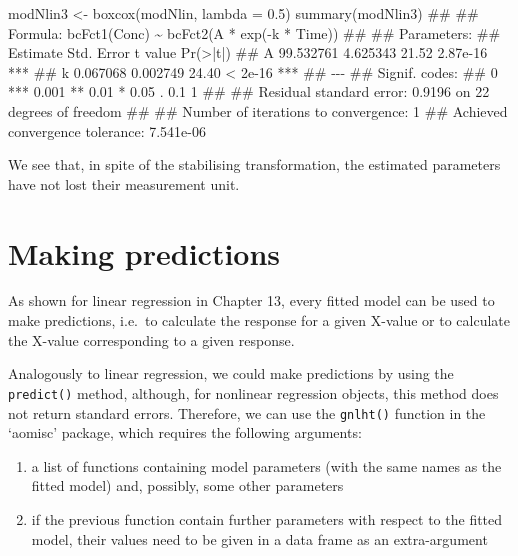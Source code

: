 \documentclass[a4paper,12pt,oneside]{book}
\providecommand{\tightlist}{%
  \setlength{\itemsep}{0pt}\setlength{\parskip}{0pt}}
\newenvironment{Shaded}{\begin{snugshade}}{\end{snugshade}}
\newcommand{\FloatTok}[1]{#1}
\newcommand{\DocumentationTok}[1]{#1}
\newcommand{\OtherTok}[1]{#1}
\newcommand{\FunctionTok}[1]{#1}
\newcommand{\AttributeTok}[1]{#1}
\newcommand{\NormalTok}[1]{#1}
\begin{document}
\vspace{12pt}

\begin{Shaded}
\begin{Highlighting}[]
\NormalTok{modNlin3 }\OtherTok{\textless{}{-}} \FunctionTok{boxcox}\NormalTok{(modNlin, }\AttributeTok{lambda =} \FloatTok{0.5}\NormalTok{)}
\FunctionTok{summary}\NormalTok{(modNlin3)}
\DocumentationTok{\#\# }
\DocumentationTok{\#\# Formula: bcFct1(Conc) \textasciitilde{} bcFct2(A * exp({-}k * Time))}
\DocumentationTok{\#\# }
\DocumentationTok{\#\# Parameters:}
\DocumentationTok{\#\#    Estimate Std. Error t value Pr(\textgreater{}|t|)    }
\DocumentationTok{\#\# A 99.532761   4.625343   21.52 2.87e{-}16 ***}
\DocumentationTok{\#\# k  0.067068   0.002749   24.40  \textless{} 2e{-}16 ***}
\DocumentationTok{\#\# {-}{-}{-}}
\DocumentationTok{\#\# Signif. codes:  }
\DocumentationTok{\#\# 0 \textquotesingle{}***\textquotesingle{} 0.001 \textquotesingle{}**\textquotesingle{} 0.01 \textquotesingle{}*\textquotesingle{} 0.05 \textquotesingle{}.\textquotesingle{} 0.1 \textquotesingle{} \textquotesingle{} 1}
\DocumentationTok{\#\# }
\DocumentationTok{\#\# Residual standard error: 0.9196 on 22 degrees of freedom}
\DocumentationTok{\#\# }
\DocumentationTok{\#\# Number of iterations to convergence: 1 }
\DocumentationTok{\#\# Achieved convergence tolerance: 7.541e{-}06}
\end{Highlighting}
\end{Shaded}

We see that, in spite of the stabilising transformation, the estimated parameters have not lost their measurement unit.

\hypertarget{making-predictions-1}{%
\section{Making predictions}\label{making-predictions-1}}

As shown for linear regression in Chapter 13, every fitted model can be used to make predictions, i.e.~to calculate the response for a given X-value or to calculate the X-value corresponding to a given response.

Analogously to linear regression, we could make predictions by using the \texttt{predict()} method, although, for nonlinear regression objects, this method does not return standard errors. Therefore, we can use the \texttt{gnlht()} function in the `aomisc' package, which requires the following arguments:

\begin{enumerate}
\def\labelenumi{\arabic{enumi}.}
\tightlist
\item
  a list of functions containing model parameters (with the same names as the fitted model) and, possibly, some other parameters
\item
  if the previous function contain further parameters with respect to the fitted model, their values need to be given in a data frame as an extra-argument
\end{enumerate}
\end{document}
